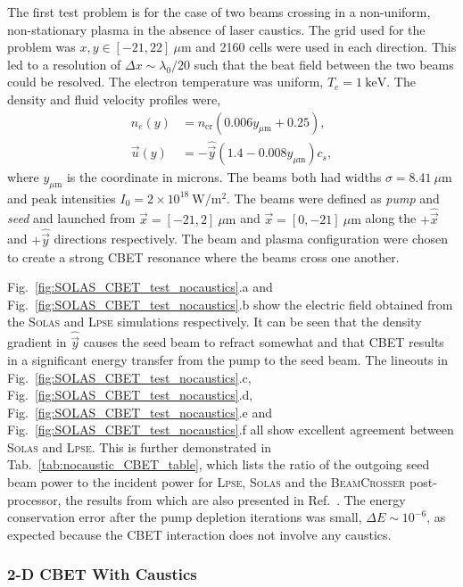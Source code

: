 The first test problem is for the case of two beams crossing in a non-uniform, non-stationary plasma in the absence of laser caustics.
The grid used for the problem was $x,y \in [-21,22]\ \mu\text{m}$ and 2160 cells were used in each direction.
This led to a resolution of $\Delta x\sim \lambda_0/20$ such that the beat field between the two beams could be resolved.
The electron temperature was uniform, $T_e=1\ \text{keV}$.
The density and fluid velocity profiles were,
\begin{align}
    n_e(y) &= n_{\text{cr}} (0.006y_{\mu\text{m}} + 0.25), \\
    \vec{u}(y) &= -\hat{\vec{y}}(1.4-0.008y_{\mu\text{m}})c_s,
\end{align}
where $y_{\mu\text{m}}$ is the coordinate in microns.
The beams both had widths $\sigma=8.41\ \mu\text{m}$ and peak intensities $I_0 = 2\times 10^{18}\ \text{W}/\text{m}^{2}$.
The beams were defined as \textit{pump} and \textit{seed} and launched from $\vec{x} = [-21,2]\ \mu\text{m}$ and $\vec{x} = [0,-21]\ \mu\text{m}$ along the $+\hat{\vec{x}}$ and $+\hat{\vec{y}}$ directions respectively.
The beam and plasma configuration were chosen to create a strong \ac{CBET} resonance where the beams cross one another.

Fig.~\ref{fig:SOLAS_CBET_test_nocaustics}.a and Fig.~\ref{fig:SOLAS_CBET_test_nocaustics}.b show the electric field obtained from the \textsc{Solas} and \textsc{Lpse} simulations respectively.
It can be seen that the density gradient in $\hat{\vec{y}}$ causes the seed beam to refract somewhat and that \ac{CBET} results in a significant energy transfer from the pump to the seed beam.
The lineouts in Fig.~\ref{fig:SOLAS_CBET_test_nocaustics}.c, Fig.~\ref{fig:SOLAS_CBET_test_nocaustics}.d, Fig.~\ref{fig:SOLAS_CBET_test_nocaustics}.e and Fig.~\ref{fig:SOLAS_CBET_test_nocaustics}.f all show excellent agreement between \textsc{Solas} and \textsc{Lpse}.
This is further demonstrated in Tab.~\ref{tab:nocaustic_CBET_table}, which lists the ratio of the outgoing seed beam power to the incident power for \textsc{Lpse}, \textsc{Solas} and the \textsc{BeamCrosser} post-processor, the results from which are also presented in Ref.~\cite{follett_validation_2022}.
The energy conservation error after the pump depletion iterations was small, $\Delta E \sim 10^{-6}$, as expected because the \ac{CBET} interaction does not involve any caustics.

\subsubsection{2-D CBET With Caustics}%
\label{sec:SOLAS_CBET_caustic_test}

